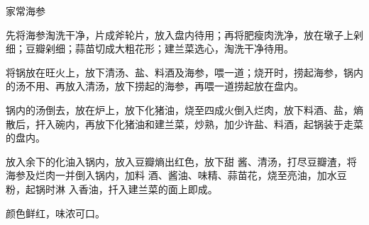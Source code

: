 \begin{recipe}{家常海参}

\ingredients



\cooking

\step 先将海参淘洗干净，片成斧轮片，放入盘内待用；再将肥瘦肉洗净，放在墩子上剁细；豆瓣剁细；蒜苗切成大粗花形；建兰菜选心，淘洗干净待用。

\step 将锅放在旺火上，放下清汤、盐、料酒及海参，喂一道；烧开时，捞起海参，锅内的汤不用、再放入清汤，放下捞起的海参，再喂一道捞起放在盘内。

\step 锅内的汤倒去，放在炉上，放下化猪油，烧至四成火倒入烂肉，放下料酒、盐，熵散后，扞入碗内，再放下化猪油和建兰菜，炒熟，加少许盐、料酒，起锅装于走菜的盘内。

放入余下的化油入锅内，放入豆瓣熵出红色，放下甜 酱、清汤，打尽豆瓣渣，将海参及烂肉一并倒入锅内，加料 酒、酱油、味精、蒜苗花，烧至亮油，加水豆粉，起锅时淋 入香油，扦入建兰菜的面上即成。

\notes

颜色鲜红，味浓可口。

\end{recipe}

